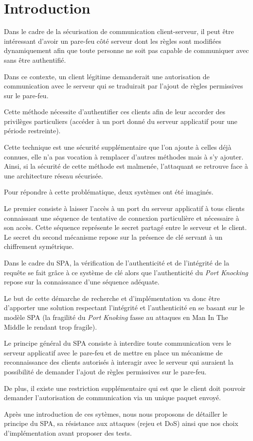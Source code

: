 \chapter*{Introduction}

Dans le cadre de la sécurisation de communication client-serveur, il peut être intéressant d'avoir un pare-feu côté serveur dont les règles sont modifiées dynamiquement afin que toute personne ne soit pas capable de communiquer avec sans être authentifié.

Dans ce contexte, un client légitime demanderait une autorisation de communication avec le serveur qui se traduirait par l'ajout de règles permissives sur le pare-feu.

Cette méthode nécessite d'authentifier ces clients afin de leur accorder des privilèges particuliers (accéder à un port donné du serveur applicatif pour une période restreinte).

Cette technique est une sécurité supplémentaire que l'on ajoute à celles déjà connues, elle n'a pas vocation à remplacer d'autres méthodes mais à s'y ajouter. Ainsi, si la sécurité de cette méthode est malmenée, l'attaquant se retrouve face à une architecture réseau sécurisée.

Pour répondre à cette problématique, deux systèmes ont été imaginés.

Le premier consiste à laisser l'accès à un port du serveur applicatif à tous clients connaissant une séquence de tentative de connexion particulière et nécessaire à son accès. Cette séquence représente le secret partagé entre le serveur et le client.
Le secret du second mécanisme repose sur la présence de clé servant à un chiffrement symétrique.

Dans le cadre du SPA, la vérification de l'authenticité et de l'intégrité  de la requête se fait grâce à ce système de clé alors que l'authenticité du \emph{Port Knocking} repose sur la connaissance d'une séquence adéquate. 

Le but de cette démarche de recherche et d'implémentation va donc être d'apporter une solution respectant l'intégrité et l'authenticité en se basant sur le modèle SPA (la fragilité du \emph{Port Knoking} fasse au attaques en Man In The Middle le rendant trop fragile). 

Le principe général du SPA consiste à interdire toute communication vers le serveur applicatif avec le pare-feu et de mettre en place un mécanisme de reconnaissance des clients autorisés à interagir avec le serveur qui auraient la possibilité de demander l'ajout de règles permissives sur le pare-feu.

De plus, il existe une restriction supplémentaire qui est que le client doit pouvoir demander l'autorisation de communication via un unique paquet envoyé.

Après une introduction de ces sytèmes, nous nous proposons de détailler le principe du SPA, sa résistance aux attaques (rejeu et DoS) ainsi que nos choix d'implémentation avant proposer des tests.
